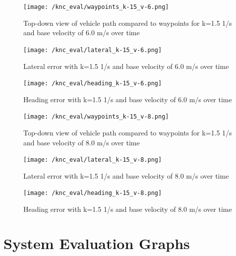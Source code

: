 \documentclass[titlepage, draft]{article}
\begin{document}
{\begin{figure}[H]
	\centering
	\begin{minipage}{.45\textwidth}
		\centering
		\texttt{[image: /knc\_eval/waypoints\_k-15\_v-6.png]}
		\caption{Top-down view of vehicle path compared to waypoints for k=1.5 1/s and base velocity of 6.0 m/s over time}
		\label{fig:wayk15v6}
	\end{minipage}%
	\hspace{0.1\textwidth}%
	\begin{minipage}{.45\textwidth}
		\centering
		\texttt{[image: /knc\_eval/lateral\_k-15\_v-6.png]}
		\caption{Lateral error with k=1.5 1/s and base velocity of 6.0 m/s over time}
		\label{fig:latk15v6}
	\end{minipage}
\end{figure}

\begin{figure}[H]
	\centering
	\begin{minipage}{.45\textwidth}
		\centering
		\texttt{[image: /knc\_eval/heading\_k-15\_v-6.png]}
		\caption{Heading error with k=1.5 1/s and base velocity of 6.0 m/s over time}
		\label{fig:headk15v6}
	\end{minipage}%
	\hspace{0.1\textwidth}%
	\begin{minipage}{.45\textwidth}
		\centering
		\texttt{[image: /knc\_eval/waypoints\_k-15\_v-8.png]}
		\caption{Top-down view of vehicle path compared to waypoints for k=1.5 1/s and base velocity of 8.0 m/s over time}
		\label{fig:wayk15v8}
	\end{minipage}
\end{figure}

\begin{figure}[H]
	\centering
	\begin{minipage}{.45\textwidth}
		\centering
		\texttt{[image: /knc\_eval/lateral\_k-15\_v-8.png]}
		\caption{Lateral error with k=1.5 1/s and base velocity of 8.0 m/s over time}
		\label{fig:latk15v8}
	\end{minipage}%
	\hspace{0.1\textwidth}%
	\begin{minipage}{.45\textwidth}
		\centering
		\texttt{[image: /knc\_eval/heading\_k-15\_v-8.png]}
		\caption{Heading error with k=1.5 1/s and base velocity of 8.0 m/s over time}
		\label{fig:headk15v4}
	\end{minipage}
\end{figure}

\section{System Evaluation Graphs}
\label{SecondAppendix}

}
\end{document}

